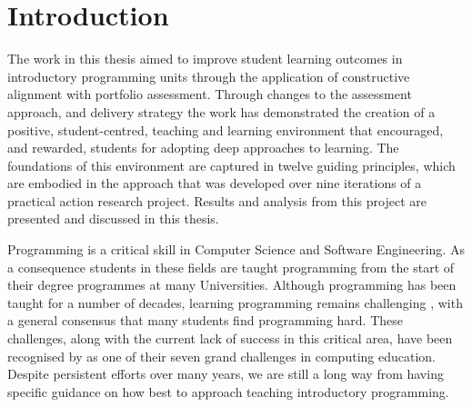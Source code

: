 
\chapter{Introduction} %
\label{cha:introduction}


The work in this thesis aimed to improve student learning outcomes in introductory programming units through the application of constructive alignment with portfolio assessment. Through changes to the assessment approach, and delivery strategy the work has demonstrated the creation of a positive, student-centred, teaching and learning environment that encouraged, and rewarded, students for adopting deep approaches to learning. The foundations of this environment are captured in twelve guiding principles, which are embodied in the approach that was developed over nine iterations of a practical action research project. Results and analysis from this project are presented and discussed in this thesis.

\bigskip

Programming is a critical skill in Computer Science and Software Engineering. As a consequence students in these fields are taught programming from the start of their degree programmes at many Universities. Although programming has been taught for a number of decades, learning programming remains challenging \cite{Jenkins:2002,Lahtinen:2005,Lister:2004,McCracken:2001,Ragonis:2007,Renumol:2010,Robins:2003,Rountree:2002,Wiedenbeck:2005}, with a general consensus that many students find programming hard. These challenges, along with the current lack of success in this critical area, have been recognised by \citet{McGettrick:2005} as one of their seven grand challenges in computing education. Despite persistent efforts over many years, we are still a long way from having specific guidance on how best to approach teaching introductory programming. 

